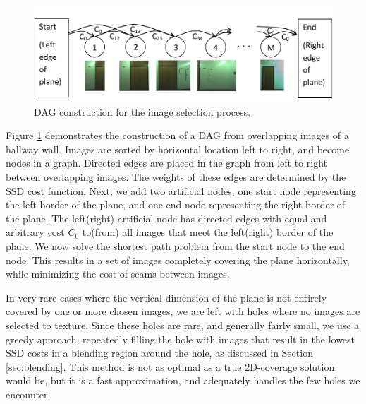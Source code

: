 \documentclass[]{spie}  %
\begin{document}
\begin{figure}
  \centering
  \includegraphics[width=5in]{dagCreation.pdf}
  \caption{DAG construction for the image selection process. \\}
  \label{fig:dagCreation}
\end{figure}

Figure \ref{fig:dagCreation} demonstrates the construction of a DAG
from overlapping images of a hallway wall. Images are sorted by
horizontal location left to right, and become nodes in a
graph. Directed edges are placed in the graph from left to right
between overlapping images. The weights of these edges are determined
by the SSD cost function. Next, we add two artificial nodes, one start
node representing the left border of the plane, and one end node
representing the right border of the plane. The left(right) artificial
node has directed edges with equal and arbitrary cost $C_0$ to(from)
all images that meet the left(right) border of the plane. We now solve
the shortest path problem from the start node to the end node. This
results in a set of images completely covering the plane horizontally,
while minimizing the cost of seams between images.

In very rare cases where the vertical dimension of the plane is not
entirely covered by one or more chosen images, we are left with holes
where no images are selected to texture. Since these holes are rare,
and generally fairly small, we use a greedy approach, repeatedly
filling the hole with images that result in the lowest SSD costs in a
blending region around the hole, as discussed in Section
\ref{sec:blending}. This method is not as optimal as a true
2D-coverage solution would be, but it is a fast approximation, and
adequately handles the few holes we encounter.
\end{document}
